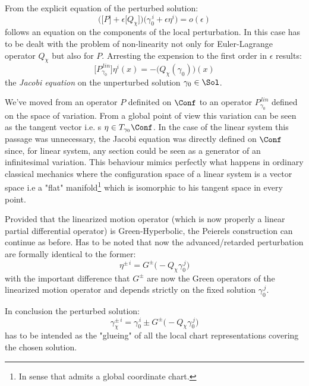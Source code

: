 \documentclass[Main]{subfiles}
\begin{document}
		From the explicit equation of the perturbed solution: 
		\begin{displaymath}
			\biggr(\big[P\big] + \epsilon\big[Q_\chi\big] \biggr) \big(\gamma_0^{\,i}+\epsilon \eta^i \big) = o(\epsilon)
		\end{displaymath}
		follows an equation on the components of the local perturbation.
		In  this case has to be dealt with the problem of non-linearity not only for Euler-Lagrange operator $Q_\chi$ but also for $P$.
		Arresting the expension to the first order in $\epsilon$ results:
		\begin{equation}\label{PeierlJacobiEqNonLin}
			\biggr[P_{\gamma_0}^{\, lin} \biggr] \eta^i(x) = -\biggr(Q_\chi(\gamma_0)\biggr)(x)
		\end{equation}
		the \emph{Jacobi equation} on the unperturbed solution $\gamma_0\in \Sol$.
		\begin{observation}
			We've moved from an operator $P$  definited on  $\Conf$ to an operator  $P_{\gamma_0}^{\, lin}  $ defined on the space of variation.
			From a global point of view this variation can be seen as the tangent vector i.e. s  $\eta \in T_{\gamma_0}\Conf$.
			In the case of the linear system this passage was unnecessary, the Jacobi equation was directly defined on $\Conf$ since, for linear system, any section could be seen as a generator of an infinitesimal variation.
			This behaviour mimics perfectly what happens in ordinary classical mechanics where the configuration space of a linear system is a vector space i.e a "flat" manifold\footnote{In sense that admits a global coordinate chart.} which is isomorphic to his tangent space in every point.
		\end{observation}
		
		Provided that the linearized motion operator (which is now properly a linear partial differential operator) is Green-Hyperbolic, the Peierels construction can continue as before.
		Has to be noted that now the advanced/retarded perturbation are formally identical to the former:
		\begin{displaymath}
			\eta^{\pm\, i} = G^\pm \big( - Q_\chi \gamma_0^{\, j})
		\end{displaymath}
		with the important difference that $G^\pm$ are now the Green operators of the linearized motion operator and depends strictly on the fixed solution $\gamma_0^{\, j}$.
		
		In conclusion the perturbed solution:
		\begin{displaymath}
			\gamma_{\chi}^{\pm\,i} = \gamma_0^{\, i} \pm G^\pm \big( -Q_\chi \gamma_0^{\,j}\big)
		\end{displaymath}
		has to be intended as the "glueing" of all the local chart representations covering the chosen solution.
\end{document}
